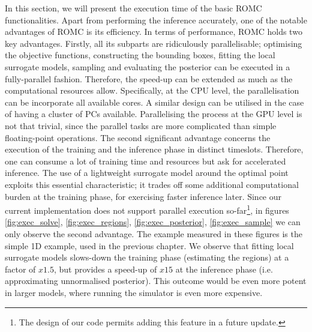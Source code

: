 In this section, we will present the execution time of the basic ROMC
functionalities. Apart from performing the inference accurately, one
of the notable advantages of ROMC is its efficiency. In terms of
performance, ROMC holds two key advantages. Firstly, all its subparts
are ridiculously parallelisable; optimising the objective functions,
constructing the bounding boxes, fitting the local surrogate models,
sampling and evaluating the posterior can be executed in a
fully-parallel fashion. Therefore, the speed-up can be extended as
much as the computational resources allow. Specifically, at the CPU
level, the parallelisation can be incorporate all available cores. A
similar design can be utilised in the case of having a cluster of PCs
available. Parallelising the process at the GPU level is not that
trivial, since the parallel tasks are more complicated than simple
floating-point operations. The second significant advantage concerns
the execution of the training and the inference phase in distinct
timeslots. Therefore, one can consume a lot of training time and
resources but ask for accelerated inference. The use of a lightweight
surrogate model around the optimal point exploits this essential
characteristic; it trades off some additional computational burden at
the training phase, for exercising faster inference later. Since our
current implementation does not support parallel execution
so-far\footnote{The design of our code permits adding this feature in
  a future update.}, in figures \ref{fig:exec_solve},
\ref{fig:exec_regions}, \ref{fig:exec_posterior},
\ref{fig:exec_sample} we can only observe the second advantage. The
example measured in these figures is the simple 1D example, used in
the previous chapter. We observe that fitting local surrogate models
slows-down the training phase (estimating the regions) at a factor of
$x1.5$, but provides a speed-up of $x15$ at the inference phase
(i.e. approximating unnormalised posterior). This outcome would be
even more potent in larger models, where running the simulator is even
more expensive.



